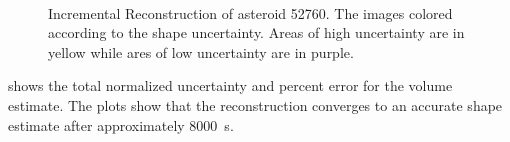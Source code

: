 \begin{figure}[htbp]
    ~
    \caption[Asteroid 52760 Shape Reconstruction with Uncertainty]{Incremental Reconstruction of asteroid 52760. The images colored according to the shape uncertainty. Areas of high uncertainty are in yellow while ares of low uncertainty are in purple.~\label{fig:52760_weights_reconstruction}}
\end{figure}
 shows the total normalized uncertainty and percent error for the volume estimate. 
The plots show that the reconstruction  converges to an accurate shape estimate after approximately \SI{8000}{\second}.

